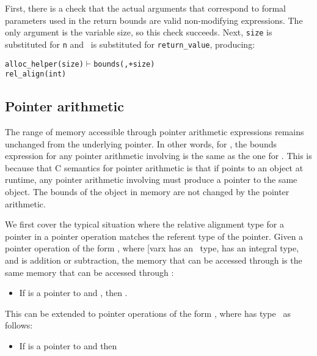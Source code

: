First, there is a check that the actual arguments that correspond to
formal parameters used in the return bounds are valid non-modifying
expressions. The only argument is the variable size, so this check
succeeds. Next, \texttt{size} is substituted for \texttt{n} and
\exprcurrentvalue\ is substituted for \texttt{return\_value}, producing:
\begin{alltt}
   alloc\_helper(size) \(\vdash\) bounds(\exprcurrentvalue, \exprcurrentvalue + size) 
                         rel_align(int)
\end{alltt}

\subsection{Pointer arithmetic}

The range of memory accessible through pointer arithmetic expressions
remains unchanged from the underlying pointer. In other words, for
, the bounds expression for any
pointer arithmetic involving  is the same as the one for
. This is because that C semantics for pointer arithmetic is
that if  points to an object at runtime, any pointer arithmetic
involving  must produce a pointer to the same object. The bounds
of the object in memory are not changed by the pointer arithmetic.

We first cover the typical situation where the relative alignment type
for a pointer in a pointer operation matches the referent type of the
pointer. Given a pointer operation of the form , where [var{x}
has an \arrayptr\ type,  has an integral type, and
 is addition or subtraction, the memory that can be accessed
through  is the same memory that can be accessed through
:

\begin{itemize}
\item
  If  is a pointer to  and 
  ,
  then .
\end{itemize}

This can be extended to pointer operations of the form ,
where  has type
\arrayptrT\ as
follows:

\begin{itemize}
\item
  If  is a pointer to  and 
  then 
\end{itemize}

